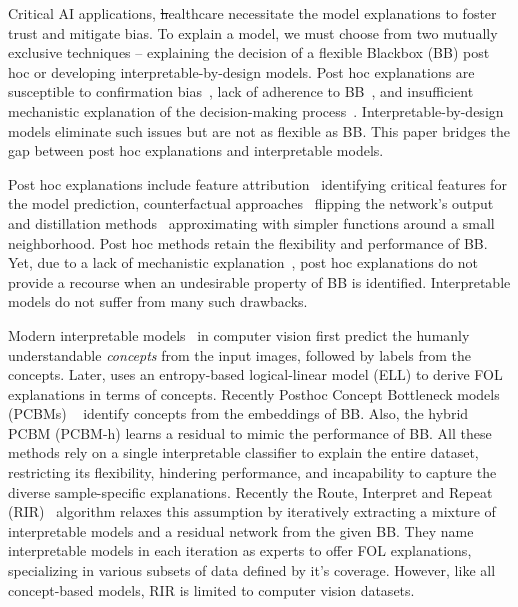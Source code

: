 Critical AI applications, \st healthcare necessitate the model explanations to foster trust and mitigate bias. To explain a model, we must choose from two mutually exclusive techniques -- explaining the decision of a flexible Blackbox (BB) post hoc or developing interpretable-by-design models. Post hoc explanations are susceptible to confirmation bias~\cite{wan2022explainability}, lack of  adherence to BB~\cite{adebayo2018sanity}, and insufficient mechanistic explanation of the decision-making process~\cite{rudin2019stop}. Interpretable-by-design models eliminate such issues but are not as flexible as BB. This paper bridges the gap between post hoc explanations and interpretable models.

Post hoc explanations include feature attribution~\cite{simonyan2013deep, selvaraju2017grad, smilkov2017smoothgrad} identifying critical features for the model prediction, counterfactual approaches~\cite{singla2019explanation, abid2021meaningfully} flipping the network's output and distillation methods~\cite{alharbi2021learning, cheng2020explaining} approximating with simpler functions around a small neighborhood. Post hoc methods retain the flexibility and performance of BB. Yet, due to a lack of mechanistic explanation~\cite{rudin2019stop}, post hoc explanations do not provide a recourse when an undesirable property of BB is identified. Interpretable models do not suffer from many such drawbacks. 


Modern interpretable models~\cite{koh2020concept, sarkar2021inducing, zarlenga2022concept} in computer vision first predict the humanly understandable \emph{concepts} from the input images, followed by labels from the concepts. Later, \cite{barbiero2022entropy} uses an entropy-based logical-linear model (ELL) to derive FOL explanations in terms of concepts. Recently Posthoc Concept Bottleneck models (PCBMs) ~\cite{yuksekgonul2022post} identify concepts from the embeddings of BB. Also, the hybrid PCBM (PCBM-h) learns a residual to mimic the performance of BB. All these methods rely on a single interpretable classifier to explain the entire dataset, restricting its flexibility, hindering performance, and incapability to capture the diverse sample-specific explanations. Recently the Route, Interpret and Repeat (RIR)~\cite{ghosh2023route} algorithm relaxes this assumption by iteratively extracting a mixture of interpretable models and a residual network from the given BB. They name interpretable models in each iteration as experts to offer FOL explanations, specializing in various subsets of data defined by it's  coverage. However, like all concept-based models, RIR is limited to computer vision datasets.

